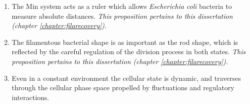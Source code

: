 \begin{enumerate}[nosep]
    \item The Min system acts as a ruler which allows \textit{Escherichia coli} bacteria to measure absolute distances.
    \textit{This proposition pertains to this dissertation (chapter \ref{chapter:filarecovery}).}
    \item 
    The filamentous \ecoli bacterial shape is as important as the rod shape, 
    which is reflected by 
    the careful regulation of the division process in both states.
    \textit{This proposition pertains to this dissertation (chapter \ref{chapter:filarecovery}).}
    \item 
    Even in a constant environment  
    the cellular state is dynamic,
    and traverses through the cellular phase space propelled by fluctuations and regulatory interactions.

\end{enumerate}

